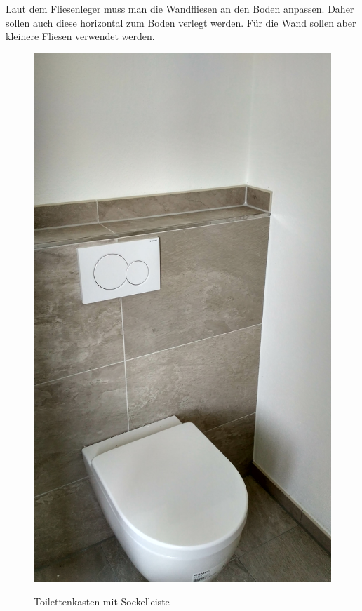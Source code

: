 Laut dem Fliesenleger muss man die Wandfliesen an den Boden anpassen. Daher sollen auch diese horizontal zum Boden verlegt werden. Für die Wand sollen aber kleinere Fliesen verwendet werden.

\begin{figure}[h]
	\begin{center}
		\noindent\includegraphics[scale=0.1]{Resources/Praktikum/IMG_20180801_131918_HDR.jpg}
		\label{toilette}
		\caption{Toilettenkasten mit Sockelleiste}	
	\end{center}
\end{figure}

